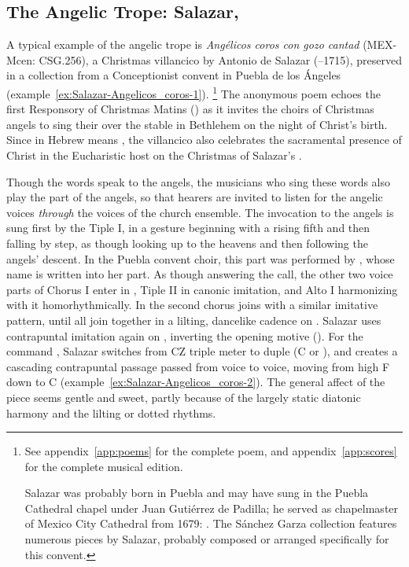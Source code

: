 \subsection{The Angelic Trope: Salazar, }

A typical example of the angelic trope is \emph{Angélicos coros con gozo cantad} (MEX-Mcen: CSG.256), a Christmas villancico by Antonio de Salazar (--1715), preserved in a collection from a Conceptionist convent in Puebla de los Ángeles (example~\ref{ex:Salazar-Angelicos_coros-1}).%
	\footnote{%
	See appendix~\ref{app:poems} for the complete poem, and appendix~\ref{app:scores} for the complete musical edition.
	
Salazar was probably born in Puebla and may have sung in the Puebla Cathedral chapel under Juan Gutiérrez de Padilla; he served as chapelmaster of Mexico City Cathedral from 1679: \autocite{Koegel:Salazar}. 
The Sánchez Garza collection features numerous pieces by Salazar, probably composed or arranged specifically for this convent.
	}
The anonymous poem echoes the first Responsory of Christmas Matins () as it invites the choirs of Christmas angels to sing their  over the stable in Bethlehem on the night of Christ's birth.
Since  in Hebrew means , the villancico also celebrates the sacramental presence of Christ in the Eucharistic host on the Christmas of Salazar's .

Though the words speak to the angels, the musicians who sing these words also play the part of the angels, so that hearers are invited to listen for the angelic voices \emph{through} the voices of the church ensemble. 
The invocation to the angels is sung first by the Tiple I, in a gesture beginning with a rising fifth and then falling by step, as though looking up to the heavens and then following the angels' descent.
In the Puebla convent choir, this part was performed by , whose name is written into her part.
As though answering the call, the other two voice parts of Chorus I enter in , Tiple II in canonic imitation, and Alto I harmonizing with it homorhythmically. 
In  the second chorus joins with a similar imitative pattern, until all join together in a lilting, dancelike cadence on .
Salazar uses contrapuntal imitation again on , inverting the opening motive ().
For the command  , Salazar switches from CZ triple meter to duple (C or ), and creates a cascading contrapuntal passage passed from voice to voice, moving from high F down to C (example~\ref{ex:Salazar-Angelicos_coros-2}).
The general affect of the piece seems gentle and sweet, partly because of the largely static diatonic harmony and the lilting or dotted rhythms.

